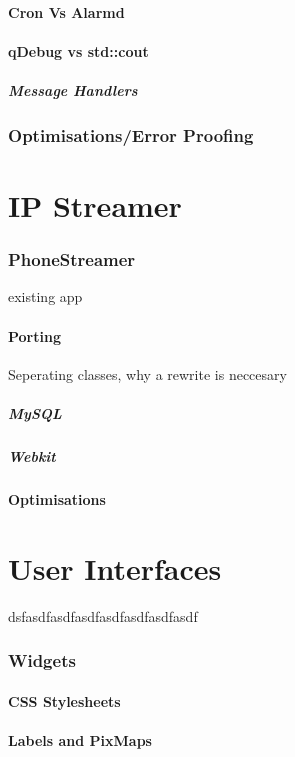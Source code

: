 \documentclass[11pt]{article} %
\begin{document}
\subsection{Cron Vs Alarmd}
\subsection{qDebug vs std::cout}
\subsubsection{Message Handlers}
\section{Optimisations/Error Proofing}


\part{IP Streamer}
\section{PhoneStreamer}{existing app}
\subsection{Porting}{Seperating classes, why a rewrite is neccesary}
\subsubsection{MySQL}
\subsubsection{Webkit}
\subsection{Optimisations}


\part{User Interfaces}{dsfasdfasdfasdfasdfasdfasdfasdf}
\section{Widgets}
\subsection{CSS Stylesheets}
\subsection{Labels and PixMaps}
\end{document}
